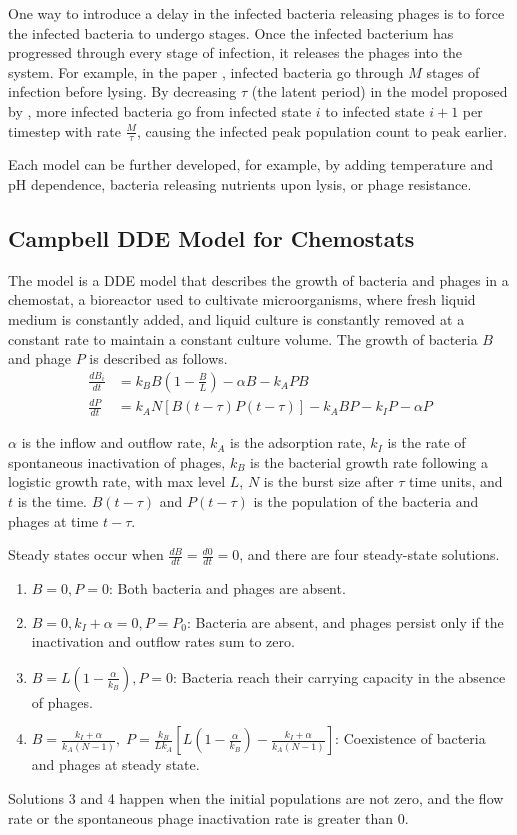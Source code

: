 One way to introduce a delay in the infected bacteria releasing phages is to force the infected bacteria to undergo stages. 
Once the infected bacterium has progressed through every stage of infection, it releases the phages into the system. 
For example, in the paper \citet{gengUsingBacterialPopulation2024}, infected bacteria go through $M$ stages of infection before lysing. 
By decreasing $\tau$ (the latent period) in the model proposed by \citet{gengUsingBacterialPopulation2024}, more infected bacteria go from infected state $i$ to infected state $i+1$ per timestep with rate $\frac{M}{\tau}$, causing the infected peak population count to peak earlier. 
 
Each model can be further developed, for example, by adding temperature and pH dependence, bacteria releasing nutrients upon lysis, or phage resistance. 

\subsection{Campbell DDE Model for Chemostats}
The \citet{campbellConditionsExistenceBacteriophage1961} model is a DDE model that describes the growth of bacteria and phages in a chemostat, a bioreactor used to cultivate microorganisms, where fresh liquid medium is constantly added, and liquid culture is constantly removed at a constant rate to maintain a constant culture volume. 
The growth of bacteria $B$ and phage $P$ is described as follows. 
\begin{align}
    \frac{d{B}_i}{dt} &= k_B B \left (1 - \frac{B}{L}\right ) -\alpha B - k_A PB \\
    \frac{dP}{dt} &= k_A N \left [B(t-\tau)P(t-\tau) \right ] - k_A BP - k_IP-\alpha P
\end{align}

$\alpha$ is the inflow and outflow rate, $k_A$ is the adsorption rate, $k_I$ is the rate of spontaneous inactivation of phages, $k_B$ is the bacterial growth rate following a logistic growth rate, with max level $L$, $N$ is the burst size after $\tau$ time units, and $t$ is the time. 
$B(t-\tau)$ and $P(t-\tau)$ is the population of the bacteria and phages at time $t-\tau$. 

Steady states occur when $\frac{dB}{dt} = \frac{d0}{dt} = 0$, and there are four steady-state solutions. 
\begin{enumerate}
    \item $B=0, P=0$: Both bacteria and phages are absent.
    \item $B=0, k_I + \alpha = 0, P = P_0$: Bacteria are absent, and phages persist only if the inactivation and outflow rates sum to zero.
    \item $B = L\left (1-\frac{\alpha}{k_B} \right ), P=0$: Bacteria reach their carrying capacity in the absence of phages.
    \item $B=\frac{k_I + \alpha}{k_A (N-1)},\; P=\frac{k_B}{Lk_A}\left [L\left ( 1- \frac{\alpha}{k_B} \right ) - \frac{k_I + \alpha}{k_A(N-1)}  \right ]$: Coexistence of bacteria and phages at steady state.
\end{enumerate}
Solutions 3 and 4 happen when the initial populations are not zero, and the flow rate or the spontaneous phage inactivation rate is greater than 0. 

